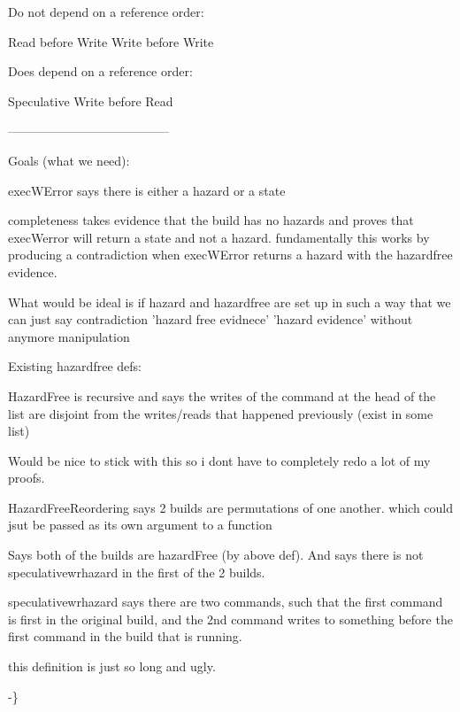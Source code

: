 \begin{code}[hide]
{Do not depend on a reference order:

   Read before Write
   Write before Write

Does depend on a reference order:
  
  Speculative Write before Read


---------------------------------------

Goals (what we need):

execWError says there is either a hazard or a state

completeness takes evidence that the build has no hazards and proves that execWerror will return 
a state and not a hazard.  fundamentally this works by producing a contradiction when execWError
returns a hazard with the hazardfree evidence. 

What would be ideal is if hazard and hazardfree are set up in such a way that we can just say
contradiction 'hazard free evidnece' 'hazard evidence' without anymore manipulation

Existing hazardfree defs:

HazardFree is recursive and says the writes of the command at the head of the list are disjoint from the writes/reads that happened previously (exist in some list)

Would be nice to stick with this so i dont have to completely redo a lot of my proofs.  

HazardFreeReordering says 2 builds are permutations of one another. which could jsut be passed as its own argument to a function

Says both of the builds are hazardFree (by above def). 
And says there is not speculativewrhazard in the first of the 2 builds.  

speculativewrhazard says there are two commands, such that the first command is first in the original build, and the 2nd command writes to something before the first command in the build that is running.

this definition is just so long and ugly.  

-\}}\<%
\\
\>[0]\AgdaSpace{}%
\AgdaSymbol{:}\AgdaSpace{}%
\<%
\\
\>[0]\AgdaSpace{}%
\AgdaSymbol{=}\AgdaSpace{}%
\AgdaSpace{}%
\<%
\end{code}

\newcommand{\fileinfo}{%
\begin{code}%
\>[0]\AgdaComment{-- the files a command read and wrote}\<%
\\
\>[0]\AgdaFunction{FileInfo}\AgdaSpace{}%
\AgdaSymbol{:}\AgdaSpace{}%
\AgdaPrimitiveType{Set}\<%
\\
\>[0]\AgdaFunction{FileInfo}\AgdaSpace{}%
\AgdaSymbol{=}\AgdaSpace{}%
\AgdaDatatype{List}\AgdaSpace{}%
\AgdaSymbol{(}\AgdaFunction{Cmd}\AgdaSpace{}%
\AgdaOperator{\AgdaFunction{×}}\AgdaSpace{}%
\AgdaFunction{FileNames}\AgdaSpace{}%
\AgdaOperator{\AgdaFunction{×}}\AgdaSpace{}%
\AgdaFunction{FileNames}\AgdaSymbol{)}\<%
\end{code}}


